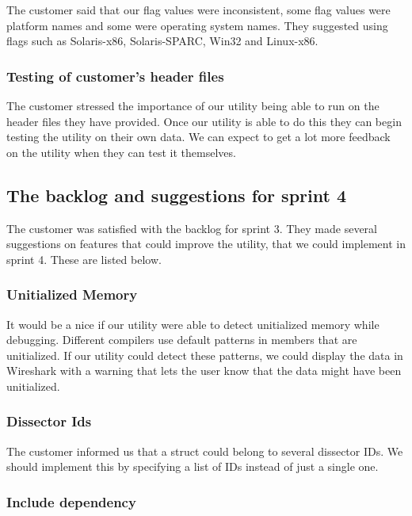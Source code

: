 The customer said that our flag values were inconsistent, some flag values were platform names and some were operating
system names. They suggested using flags such as Solaris-x86, Solaris-SPARC, Win32 and Linux-x86.

\subsubsection{Testing of customer's header files}

The customer stressed the importance of our utility being able to run on the header files they have provided.
Once our utility is able to do this they can begin testing the utility on their own data.
We can expect to get a lot more feedback on the utility when they can test it themselves.


\subsection{The backlog and suggestions for sprint 4}

The customer was satisfied with the backlog for sprint 3.
They made several suggestions on features that could improve the utility, that we could implement in sprint 4.
These are listed below.

\subsubsection{Unitialized Memory}

It would be a nice if our utility were able to detect unitialized memory while debugging.
Different compilers use default patterns in members that are unitialized. If our utility could detect these patterns,
we could display the data in Wireshark with a warning that lets the user know that the data might have been unitialized.

\subsubsection{Dissector Ids}

The customer informed us that a struct could belong to several dissector IDs.
We should implement this by specifying a list of IDs instead of just a single one.

\subsubsection{Include dependency}

